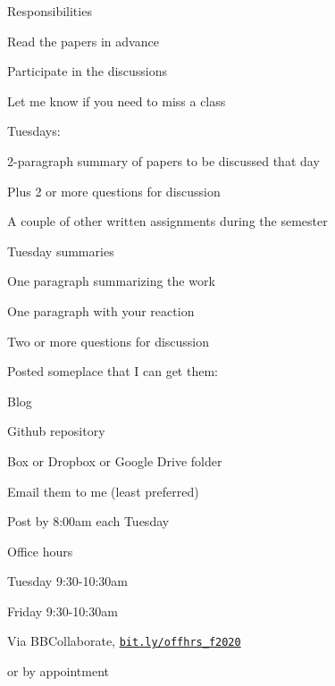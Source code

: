 \documentclass[aspectratio=169,12pt,t]{beamer}
\begin{document}
\begin{frame}{Responsibilities}

  \bbi
\item Read the papers in advance
\item Participate in the discussions
\item Let me know if you need to miss a class
\item Tuesdays:
  \bi
  \item 2-paragraph summary of papers to be discussed that day
  \item Plus 2 or more questions for discussion
  \ei
\item A couple of other written assignments during the semester
  \ei

\end{frame}



\begin{frame}{Tuesday summaries}

  \bbi
\item One paragraph summarizing the work
\item One paragraph with your reaction
\item Two or more questions for discussion
\item Posted someplace that I can get them:
  \bi
\item Blog
\item Github repository
\item Box or Dropbox or Google Drive folder
\item Email them to me (least preferred)
  \ei
\item Post by 8:00am each Tuesday
\ei

\end{frame}


\begin{frame}{Office hours}

  \bbi
\item Tuesday 9:30-10:30am
\item Friday 9:30-10:30am
\item Via BBCollaborate, \href{https://bit.ly/offhrs_f2020}{\tt bit.ly/offhrs\_f2020}
\item \hilit or by appointment
\ei

\end{frame}
\end{document}
